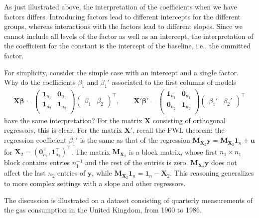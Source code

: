 \documentclass[]{book}
\theoremstyle{definition}
\theoremstyle{definition}
\theoremstyle{definition}
\theoremstyle{remark}
\begin{document}
As just illustrated above, the interpretation of the coefficients when
we have factors differs. Introducing factors lead to different
intercepts for the different groups, whereas interactions with the
factors lead to different slopes. Since we cannot include all levels of
the factor as well as an intercept, the interpretation of the
coefficient for the constant is the intercept of the baseline, i.e., the
ommitted factor.

For simplicity, consider the simple case with an intercept and a single
factor. Why do the coefficients \(\beta_1\) and \(\beta_1'\) associated
to the first columns of models \begin{align*}
 \mathbf{X}\boldsymbol{\beta} = \begin{pmatrix}
       \mathbf{1}_{n_1} & \mathbf{0}_{n_1} \\
       \mathbf{1}_{n_2} & \mathbf{1}_{n_2}  \\
      \end{pmatrix}\begin{pmatrix} \beta_1 & \beta_2\end{pmatrix}^\top, \qquad 
      \mathbf{X}'\boldsymbol{\beta}' =  \begin{pmatrix}
       \mathbf{1}_{n_1} & \mathbf{0}_{n_1} \\
       \mathbf{0}_{n_2} & \mathbf{1}_{n_2}  \\
      \end{pmatrix}\begin{pmatrix} \beta_1' & \beta_2'\end{pmatrix}^\top
\end{align*} have the same interpretation? For the matrix \(\mathbf{X}\)
consisting of orthogonal regressors, this is clear. For the matrix
\(\mathbf{X}'\), recall the FWL theorem: the regression coefficient
\(\beta_1'\) is the same as that of the regression
\(\mathbf{M}_{\mathbf{X}_2}\boldsymbol{y} = \mathbf{M}_{\mathbf{X}_2}\mathbf{1}_n + \boldsymbol{u}\)
for
\(\mathbf{X}_2 = (\mathbf{0}_{n_1}^\top, \mathbf{1}_{n_2}^\top)^\top\).
The matrix \(\mathbf{M}_{\mathbf{X}_2}\) is a block matrix, whose first
\(n_1 \times n_1\) block contains entries \(n_1^{-1}\) and the rest of
the entries is zero. \(\mathbf{M}_{\mathbf{X}_2}\boldsymbol{y}\) does
not affect the last \(n_2\) entries of \(\boldsymbol{y}\), while
\(\mathbf{M}_{\mathbf{X}_2}\mathbf{1}_n = \mathbf{1}_n - \mathbf{X}_2\).
This reasoning generalizes to more complex settings with a slope and
other regressors.

The discussion is illustrated on a dataset consisting of quarterly
measurements of the gas consumption in the United Kingdom, from 1960 to
1986.
\end{document}
